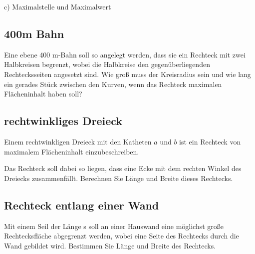 c) Maximalstelle und Maximalwert


\subsection{400m Bahn}

Eine ebene 400 m-Bahn soll so angelegt werden, dass sie ein Rechteck mit zwei
Halbkreisen begrenzt, wobei die Halbkreise den gegenüberliegenden Rechtecksseiten
angesetzt sind. Wie groß muss der Kreisradius sein und wie lang ein gerades Stück
zwischen den Kurven, wenn das Rechteck maximalen Flächeninhalt haben soll?


\subsection{rechtwinkliges Dreieck}

Einem rechtwinkligen Dreieck mit den Katheten $a$ und $b$ ist ein Rechteck von
maximalem Flächeninhalt einzubeschreiben.


Das Rechteck soll dabei so liegen, dass
eine Ecke mit dem rechten Winkel des Dreiecks zusammenfällt.
Berechnen Sie Länge und Breite dieses Rechtecks.



\subsection{Rechteck entlang einer Wand}

Mit einem Seil der Länge s soll an einer Hauswand eine möglichst große Rechtecksfläche abgegrenzt werden, wobei eine Seite des Rechtecks durch die Wand gebildet
wird. Bestimmen Sie Länge und Breite des Rechtecks.

